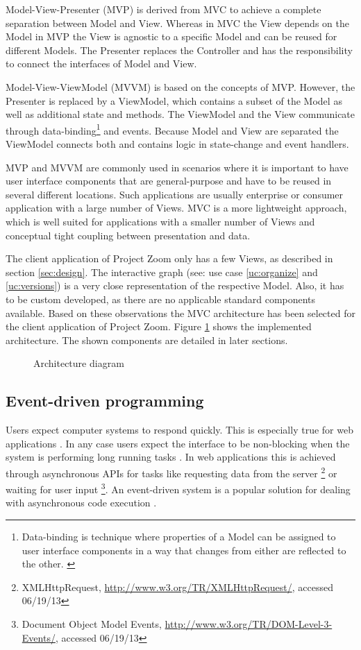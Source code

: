 Model-View-Presenter (MVP) is derived from MVC to achieve a complete separation between Model and View. Whereas in MVC the View depends on the Model in MVP the View is agnostic to a specific Model and can be reused for different Models. The Presenter replaces the Controller and has the responsibility to connect the interfaces of Model and View. 

Model-View-ViewModel (MVVM) is based on the concepts of MVP. However, the Presenter is replaced by a ViewModel, which contains a subset of the Model as well as additional state and methods. The ViewModel and the View communicate through data-binding\footnote{Data-binding is technique where properties of a Model can be assigned to user interface components in a way that changes from either are reflected to the other. \cite{Bent_2004}} and events. Because Model and View are separated the ViewModel connects both and contains logic in state-change and event handlers.

MVP and MVVM are commonly used in scenarios where it is important to have user interface components that are general-purpose and have to be reused in several different locations. Such applications are usually enterprise or consumer application with a large number of Views. MVC is a more lightweight approach, which is well suited for applications with a smaller number of Views and conceptual tight coupling between presentation and data. \cite{Osmani_2012}

The client application of Project Zoom only has a few Views, as described in section \ref{sec:design}. The interactive graph (see: use case \ref{uc:organize} and \ref{uc:versions}) is a very close representation of the respective Model. Also, it has to be custom developed, as there are no applicable standard components available. Based on these observations the MVC architecture has been selected for the client application of Project Zoom. Figure \ref{fig:arch} shows the implemented architecture. The shown components are detailed in later sections.

\begin{figure}
\caption{Architecture diagram}
\label{fig:arch}
\end{figure}


\subsection{Event-driven programming}
\label{sec:eventbased}

Users expect computer systems to respond quickly. This is especially true for web applications \cite{Selvidge_1999}. In any case users expect the interface to be non-blocking when the system is performing long running tasks \cite{Nielsen_1994}.  In web applications this is achieved through asynchronous APIs for tasks like requesting data from the server \footnote{XMLHttpRequest, \url{http://www.w3.org/TR/XMLHttpRequest/}, accessed 06/19/13} or waiting for user input \footnote{Document Object Model Events, \url{http://www.w3.org/TR/DOM-Level-3-Events/}, accessed 06/19/13}. An event-driven system is a popular solution for dealing with asynchronous code execution \cite{Michelson_2006}. 

